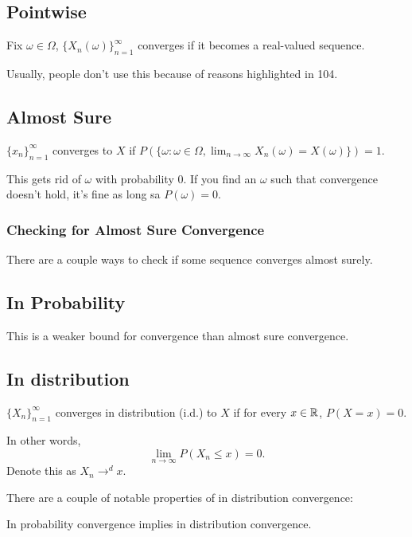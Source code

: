 \documentclass{article}
\begin{document}
\subsection{Pointwise}
\begin{definition}
	Fix $\omega \in \Omega$, $\{X_n(\omega)\}_{n=1}^\infty$ converges  if it becomes a real-valued sequence. 
\end{definition}

Usually, people don't use this because of reasons highlighted in 104.
\subsection{Almost Sure}
\begin{definition} 
	$\{x_n\}_{n=1}^\infty$ converges  to $X$ if $P(\{\omega : \omega \in \Omega, \lim_{n \to \infty} X_n(\omega) = X(\omega)\}) = 1$.
\end{definition}

This gets rid of $\omega$ with probability $0$. If you find an $\omega$ such that convergence doesn't hold, it's fine as long sa $P(\omega) = 0$. 

\subsubsection{Checking for Almost Sure Convergence}
There are a couple ways to check if some sequence converges almost surely.
\subsection{In Probability}
This is a weaker bound for convergence than almost sure convergence.

\subsection{In distribution}
\begin{definition}
	$\{X_n\}_{n=1}^\infty$ converges in distribution (i.d.) to $X$ if for every $x \in \mathbb R$, $P(X = x) = 0$.

	In other words, \[\lim_{n\to\infty} P(X_n \leq x) = 0.\] Denote this as $X_n \to^d x$.
\end{definition}

There are a couple of notable properties of in distribution convergence: 

\begin{theorem}
	In probability convergence implies in distribution convergence. 
\end{theorem}
\end{document}
